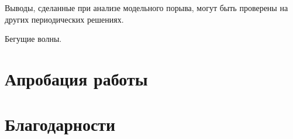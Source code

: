 Выводы, сделанные при анализе модельного порыва, могут быть проверены на других периодических решениях.

Бегущие волны.

\section{Апробация работы}

\section{Благодарности}


